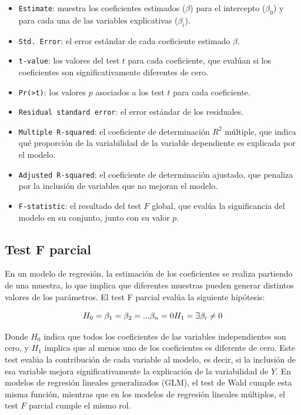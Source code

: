 \documentclass[
  spanish,
  a4paper,
]{scrbook}
\begin{document}
\begin{itemize}
\item
  \texttt{Estimate}: muestra los coeficientes estimados (\(\beta\)) para
  el intercepto (\(\beta_0\)) y para cada una de las variables
  explicativas (\(\beta_i\)).
\item
  \texttt{Std.\ Error}: el error estándar de cada coeficiente estimado
  \(\beta\).
\item
  \texttt{t-value}: los valores del test \(t\) para cada coeficiente,
  que evalúan si los coeficientes son significativamente diferentes de
  cero.
\item
  \texttt{Pr(\textgreater{}\textbar{}t\textbar{})}: los valores \(p\)
  asociados a los test \(t\) para cada coeficiente.
\item
  \texttt{Residual\ standard\ error}: el error estándar de los
  residuales.
\item
  \texttt{Multiple\ R-squared}: el coeficiente de determinación \(R^2\)
  múltiple, que indica qué proporción de la variabilidad de la variable
  dependiente es explicada por el modelo.
\item
  \texttt{Adjusted\ R-squared}: el coeficiente de determinación
  ajustado, que penaliza por la inclusión de variables que no mejoran el
  modelo.
\item
  \texttt{F-statistic}: el resultado del test \(F\) global, que evalúa
  la significancia del modelo en su conjunto, junto con su valor \(p\).
\end{itemize}

\subsection{Test F parcial}\label{test-f-parcial}

En un modelo de regresión, la estimación de los coeficientes se realiza
partiendo de una muestra, lo que implica que diferentes muestras pueden
generar distintos valores de los parámetros. El test F parcial evalúa la
siguiente hipótesis:

\[
H_0 = \beta_1 = \beta_2 = ... \beta_n = 0  \\H_1 = \exists\beta_i \neq 0
\]

Donde \(H_0\) indica que todos los coeficientes de las variables
independientes son cero, y \(H_1\) implica que al menos uno de los
coeficientes es diferente de cero. Este test evalúa la contribución de
cada variable al modelo, es decir, si la inclusión de esa variable
mejora significativamente la explicación de la variabilidad de \(Y\). En
modelos de regresión lineales generalizados (GLM), el test de Wald
cumple esta misma función, mientras que en los modelos de regresión
lineales múltiplos, el test \(F\) parcial cumple el mismo rol.
\end{document}
